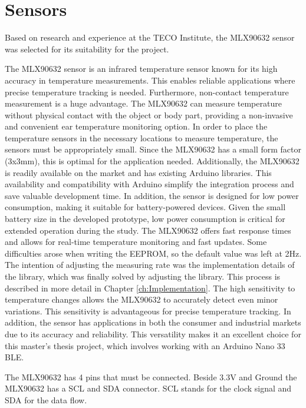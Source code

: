
\section{Sensors}
\label{ch:Design:Prototype:Sensors}

Based on research and experience at the TECO Institute, the MLX90632 sensor was selected for its suitability for the project.

The MLX90632 sensor is an infrared temperature sensor known for its high accuracy in temperature measurements. This enables reliable applications where precise temperature tracking is needed.
Furthermore, non-contact temperature measurement is a huge advantage. 
The MLX90632 can measure temperature without physical contact with the object or body part, providing a non-invasive and convenient ear temperature monitoring option.
In order to place the temperature sensors in the necessary locations to measure temperature, the sensors must be appropriately small. 
Since the MLX90632 has a small form factor (3x3mm), this is optimal for the application needed.
Additionally, the MLX90632 is readily available on the market and has existing Arduino libraries. 
This availability and compatibility with Arduino simplify the integration process and save valuable development time.
In addition, the sensor is designed for low power consumption, making it suitable for battery-powered devices. 
Given the small battery size in the developed prototype, low power consumption is critical for extended operation during the study.
The MLX90632 offers fast response times and allows for real-time temperature monitoring and fast updates. 
Some difficulties arose when writing the EEPROM, so the default value was left at 2Hz.
The intention of adjusting the measuring rate was the implementation details of the library, which was finally solved by adjusting the library. 
This process is described in more detail in Chapter \ref{ch:Implementation}.
The high sensitivity to temperature changes allows the MLX90632 to accurately detect even minor variations. 
This sensitivity is advantageous for precise temperature tracking.
In addition, the sensor has applications in both the consumer and industrial markets due to its accuracy and reliability. 
This versatility makes it an excellent choice for this master's thesis project, which involves working with an Arduino Nano 33 BLE.

The MLX90632 has 4 pins that must be connected. 
Beside 3.3V and Ground the MLX90632 has a SCL and SDA connector. 
SCL stands for the clock signal and SDA for the data flow.

